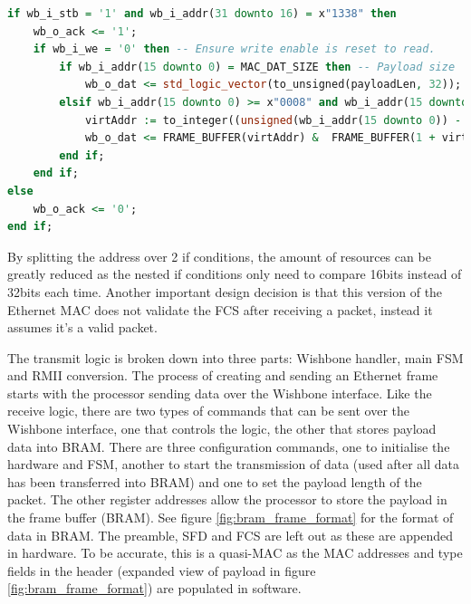 \begin{lstlisting}[language=VHDL, caption=Wishbone access logic for Ethernet receive]
if wb_i_stb = '1' and wb_i_addr(31 downto 16) = x"1338" then 
    wb_o_ack <= '1';
    if wb_i_we = '0' then -- Ensure write enable is reset to read.
        if wb_i_addr(15 downto 0) = MAC_DAT_SIZE then -- Payload size
            wb_o_dat <= std_logic_vector(to_unsigned(payloadLen, 32));
        elsif wb_i_addr(15 downto 0) >= x"0008" and wb_i_addr(15 downto 0) <= x"05F8" then -- BRAM access
            virtAddr := to_integer((unsigned(wb_i_addr(15 downto 0)) - 8));
            wb_o_dat <= FRAME_BUFFER(virtAddr) &  FRAME_BUFFER(1 + virtAddr) & FRAME_BUFFER(2 + virtAddr) & FRAME_BUFFER(3 + virtAddr);
        end if;
    end if;
else
    wb_o_ack <= '0';
end if;
\end{lstlisting}

By splitting the address over 2 if conditions, the amount of resources can be greatly reduced as the nested if conditions only need to compare 16bits instead of 32bits each time. Another important design decision is that this version of the Ethernet MAC does not validate the FCS after receiving a packet, instead it assumes it's a valid packet. 


The transmit logic is broken down into three parts: Wishbone handler, main FSM and RMII conversion. The process of creating and sending an Ethernet frame starts with the processor sending data over the Wishbone interface. Like the receive logic, there are two types of commands that can be sent over the Wishbone interface, one that controls the logic, the other that stores payload data into BRAM. There are three configuration commands, one to initialise the hardware and FSM, another to start the transmission of data (used after all data has been transferred into BRAM) and one to set the payload length of the packet. The other register addresses allow the processor to store the payload in the frame buffer (BRAM). See figure \ref{fig:bram_frame_format} for the format of data in BRAM. The preamble, SFD and FCS are left out as these are appended in hardware. To be accurate, this is a quasi-MAC as the MAC addresses and type fields in the header (expanded view of payload in figure \ref{fig:bram_frame_format}) are populated in software. 

